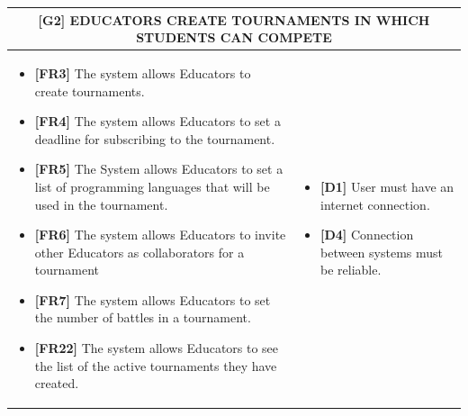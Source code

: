 \documentclass{article}
\begin{document}
\begin{table}
\begin{adjustwidth}{-1in}{-1in}
 \renewcommand{\arraystretch}{1.5}
    \begin{tabular}{|p{9.5cm}|p{9.5cm}|}
        \hline
        \multicolumn{2}{|c|}{\textbf{[G2] EDUCATORS CREATE TOURNAMENTS IN WHICH STUDENTS CAN COMPETE}} \\
        \hline
        \begin{itemize}[label={}, left=0pt, align=left, itemsep=5pt]
            \item \textbf{[FR3]} The system allows Educators to create tournaments.
            \item \textbf{[FR4]} The system allows Educators to set a deadline for subscribing to the tournament.
            \item \textbf{[FR5]} The System allows Educators to set a list of programming languages that will be used in the tournament.
            \item \textbf{[FR6]} The system allows Educators to invite other Educators as collaborators for a tournament
            \item \textbf{[FR7]} The system allows Educators to set the number of battles in a tournament.
            \item \textbf{[FR22]} The system allows Educators to see the list of the active tournaments they have created.
        \end{itemize} &
        \begin{itemize}[label={}, left=0pt, align=left, itemsep=5pt]
            \item \textbf{[D1]} User must have an internet connection.
            \item \textbf{[D4]} Connection between systems must be reliable.
        \end{itemize} \\
        \hline
    \end{tabular}
\end{adjustwidth}
\end{table}
\end{document}
